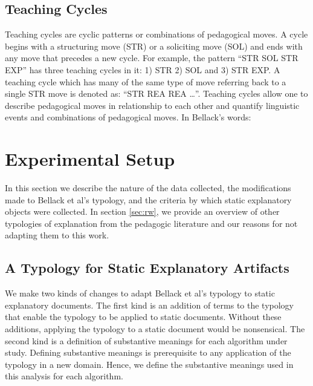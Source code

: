 \documentclass[conference]{IEEEtran}
\begin{document}
\subsection{Teaching Cycles}
Teaching cycles are cyclic patterns or combinations of pedagogical moves. A
cycle begins with a structuring move (STR) or a soliciting move (SOL) and ends
with any move that precedes a new cycle. For example, the pattern ``STR SOL STR
EXP'' has three teaching cycles in it: 1) STR 2) SOL and 3) STR EXP. A teaching
cycle which has many of the same type of move referring back to a single STR
move is denoted as: ``STR REA REA \ldots''. Teaching cycles allow one to
describe pedagogical moves in relationship to each other and quantify linguistic
events and combinations of pedagogical moves. In Bellack's words:



\section{Experimental Setup}
In this section we describe the nature of the data collected, the modifications
made to Bellack et al's typology, and the criteria by which static explanatory
objects were collected. In section \ref{sec:rw}, we provide an overview of other
typologies of explanation from the pedagogic literature and our reasons for not
adapting them to this work. 

\subsection{A Typology for Static Explanatory Artifacts}
\label{sec:exp:typ}

We make two kinds of changes to adapt Bellack et al's typology to static
explanatory documents. The first kind is an addition of terms to the typology
that enable the typology to be applied to static documents. Without these additions,
applying the typology to a static document would be nonsensical. The second kind
is a definition of substantive meanings for each algorithm under study.
Defining substantive meanings is prerequisite to any application of the typology
in a new domain. Hence, we define the substantive meanings used in this analysis
for each algorithm.
\end{document}
